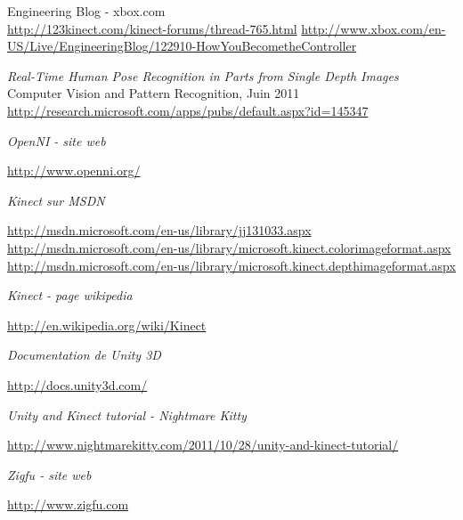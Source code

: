 \begin{thebibliography}{200}
\begin{footnotesize}
  \begin{tiny}
  Engineering Blog - xbox.com\\
  \url{http://123kinect.com/kinect-forums/thread-765.html}
  \url{http://www.xbox.com/en-US/Live/EngineeringBlog/122910-HowYouBecometheController}
  \end{tiny}

  \begin{tiny}
  \emph{Real-Time Human Pose Recognition in Parts from Single Depth Images}\\
  Computer Vision and Pattern Recognition, Juin 2011\\
  \url{http://research.microsoft.com/apps/pubs/default.aspx?id=145347}
  \end{tiny}
  
  \emph{OpenNI - site web}\\
  \begin{tiny}
  \url{http://www.openni.org/}
  \end{tiny}
  
  \emph{Kinect sur MSDN}\\
  \begin{tiny}
  \url{http://msdn.microsoft.com/en-us/library/jj131033.aspx}
  \url{http://msdn.microsoft.com/en-us/library/microsoft.kinect.colorimageformat.aspx}
  \url{http://msdn.microsoft.com/en-us/library/microsoft.kinect.depthimageformat.aspx}
  \end{tiny}

  \emph{Kinect - page wikipedia}\\
  \begin{tiny}
  \url{http://en.wikipedia.org/wiki/Kinect}
  \end{tiny}
  
  \emph{Documentation de Unity 3D}\\
  \begin{tiny}
  \url{http://docs.unity3d.com/}
  \end{tiny}
  
  \emph{Unity and Kinect tutorial - Nightmare Kitty}\\
  \begin{tiny}
  \url{http://www.nightmarekitty.com/2011/10/28/unity-and-kinect-tutorial/}
  \end{tiny}

  \emph{Zigfu - site web}\\
  \begin{tiny}
  \url{http://www.zigfu.com}
  \end{tiny}


\end{footnotesize}
\end{thebibliography}
